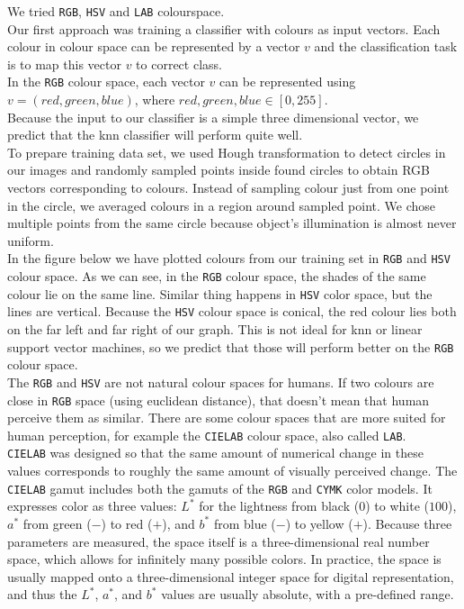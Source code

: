 \documentclass[12pt,a4paper]{article}
\begin{document}
	We tried \texttt{RGB}, \texttt{HSV} and \texttt{LAB} colourspace.\\

	Our first approach was training a classifier with colours as input vectors. Each colour in colour space can be represented by a vector $v$ and the classification task is to map this vector $v$ to correct class. \\
	
	In the \texttt{RGB} colour space, each vector $v$ can be represented using $v = (red, green, blue)$, where $red, green, blue \in [0, 255]$. \\

	Because the input to our classifier is a simple three dimensional vector, we predict that the knn classifier will perform quite well. \\	
	
	To prepare training data set, we used Hough transformation to detect circles in our images and randomly sampled points inside found circles to obtain RGB vectors corresponding to colours. Instead of sampling colour just from one point in the circle, we averaged colours in a region around sampled point. We chose multiple points from the same circle because object's illumination is almost never uniform. \\
	
	In the figure below we have plotted colours from our training set in \texttt{RGB} and \texttt{HSV} colour space. As we can see, in the \texttt{RGB} colour space, the shades of the same colour lie on the same line. Similar thing happens in \texttt{HSV} color space, but the lines are vertical. Because the \texttt{HSV} colour space is conical, the red colour lies both on the far left and far right of our graph. This is not ideal for knn or linear support vector machines, so we predict that those will perform better on the \texttt{RGB} colour space. \\
	
	The \texttt{RGB} and \texttt{HSV} are not natural colour spaces for humans. If two colours are close in \texttt{RGB} space (using euclidean distance), that doesn't mean that human perceive them as similar. There are some colour spaces that are more suited for human perception, for example the \texttt{CIELAB} colour space, also called \texttt{LAB}. \\

	\texttt{CIELAB} was designed so that the same amount of numerical change in these values corresponds to roughly the same amount of visually perceived change. The  \texttt{CIELAB} gamut includes both the gamuts of the \texttt{RGB} and \texttt{CYMK} color models. It expresses color as three values: $L^*$ for the lightness from black ($0$) to white ($100$), $a^*$ from green (−) to red ($+$), and $b^*$ from blue (−) to yellow ($+$). Because three parameters are measured, the space itself is a three-dimensional real number space, which allows for infinitely many possible colors. In practice, the space is usually mapped onto a three-dimensional integer space for digital representation, and thus the $L^*$, $a^*$, and $b^*$ values are usually absolute, with a pre-defined range. \\
	
\end{document}
